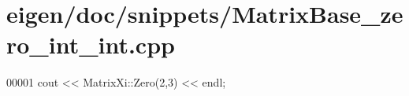 \hypertarget{eigen_2doc_2snippets_2_matrix_base__zero__int__int_8cpp_source}{}\section{eigen/doc/snippets/\+Matrix\+Base\+\_\+zero\+\_\+int\+\_\+int.cpp}
\label{eigen_2doc_2snippets_2_matrix_base__zero__int__int_8cpp_source}

\begin{DoxyCode}
00001 cout << MatrixXi::Zero(2,3) << endl;
\end{DoxyCode}
